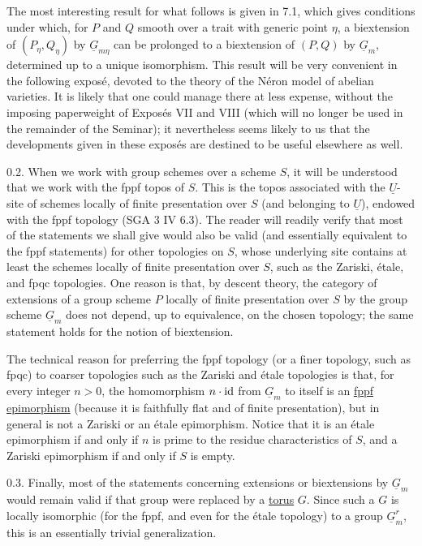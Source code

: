 The most interesting result for what follows is given in 7.1, which
gives conditions under which, for $P$ and $Q$ smooth over a trait with
generic point $\eta$, a biextension of $(P_\eta,Q_\eta)$ by
$\underline G_{m\eta}$ can be prolonged to a biextension of $(P,Q)$ by
$\underline G_m$, determined up to a unique isomorphism.  This result
will be very convenient in the following expos\'e, devoted to the
theory of the N\'eron model of abelian varieties.  It is likely that
one could manage there at less expense, without the imposing
paperweight of Expos\'es VII and VIII (which will no longer be used in
the remainder of the Seminar); it nevertheless seems likely to us that
the developments given in these expos\'es are destined to be useful
elsewhere as well.

0.2. When we work with group schemes over a scheme $S$, it will be
understood that we work with the fppf topos of $S$.  This is the topos
associated with the $\underline U$-site of schemes locally of finite
presentation over $S$ (and belonging to $\underline U$), endowed with
the fppf topology (SGA 3 IV 6.3).  The reader will readily verify that
most of the statements we shall give would also be valid (and
essentially equivalent to the fppf statements) for other topologies on
$S$, whose underlying site contains at least the schemes locally of
finite presentation over $S$, such as the Zariski, \'etale, and fpqc
topologies.  One reason is that, by descent theory, the category of
extensions of a group scheme $P$ locally of finite presentation over
$S$ by the group scheme $\underline G_m$ does not depend, up to
equivalence, on the chosen topology; the same statement holds for the
notion of biextension.

The technical reason for preferring the fppf topology (or a finer
topology, such as fpqc) to coarser topologies such as the Zariski and
\'etale topologies is that, for every integer $n>0$, the homomorphism
$n\cdot\mathrm{id}$ from $\underline G_m$ to itself is an \underline{fppf
epimorphism} (because it is faithfully flat and of finite
presentation), but in general is not a Zariski or an \'etale
epimorphism.  Notice that it is an \'etale epimorphism if and only if
$n$ is prime to the residue characteristics of $S$, and a Zariski
epimorphism if and only if $S$ is empty.

0.3. Finally, most of the statements concerning extensions or
biextensions by $\underline G_m$ would remain valid if that group were
replaced by a \underline{torus} $G$.  Since such a $G$ is locally
isomorphic (for the fppf, and even for the \'etale topology) to a group
$\underline G_m^r$, this is an essentially trivial generalization.
